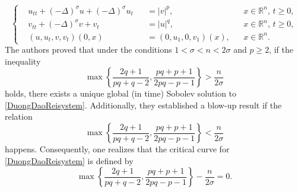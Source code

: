 \documentclass[11pt,reqno]{amsart}
\numberwithin{equation}{section}
\begin{document}
\begin{equation}\label{DuongDaoReisystem}
\left\{
\begin{aligned}
    &u_{tt}+(-\Delta)^{\sigma} u+(-\Delta)^{\sigma}u_t &&=|v|^{p}, &&x\in \mathbb{R}^n,\,t\geq 0,\\
    &v_{tt}+(-\Delta)^{\sigma}v+v_t &&=|u|^{q}, &&x\in \mathbb{R}^n,\,t\geq 0,\\
    &(u,u_t,v,v_t)(0,x) &&= (0,u_1,0,v_1)(x), &&x\in \mathbb{R}^n.
\end{aligned}
\right.
\end{equation}
The authors proved that under the conditions $1 < \sigma < n < 2\sigma$ and $p \geq 2$, if the inequality
$$ \max\left\{\frac{2q+1}{pq+q-2}, \frac{pq+p+1}{2pq-p-1}\right\} > \frac{n}{2\sigma} $$
holds, there exists a unique global (in time) Sobolev solution to \eqref{DuongDaoReisystem}. Additionally, they established a blow-up result if the relation
$$ \max\left\{\frac{2q+1}{pq+q-2}, \frac{pq+p+1}{2pq-p-1}\right\} < \frac{n}{2\sigma} $$
happens. Consequently, one realizes that the critical curve for \eqref{DuongDaoReisystem} is defined by
\begin{equation}\label{critcurve}\tag{$*$}
\max\left\{\frac{2q+1}{pq+q-2}, \frac{pq+p+1}{2pq-p-1}\right\}-\frac{n}{2\sigma}=0.
\end{equation}
\end{document}
